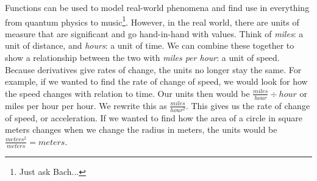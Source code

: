 \documentclass[../revisedmain.tex]{subfiles}
\begin{document}
	Functions can be used to model real-world phenomena and find use in everything from quantum physics to music\footnote{Just ask Bach...}. However, in the real world, there are units of measure that are significant and go hand-in-hand with values. Think of \textit{miles}: a unit of distance, and \textit{hours}: a unit of time. We can combine these together to show a relationship between the two with \textit{miles per hour}: a  unit of speed. Because derivatives give rates of change, the units no longer stay the same. For example, if we wanted to find the rate of change of speed, we would look for how the speed changes with relation to time. Our units then would be $\displaystyle\frac{miles}{hour}\div hour$ or miles per hour per hour. We rewrite this as $\displaystyle\frac{miles}{hour^2}$. This gives us the rate of change of speed, or acceleration. If we wanted to find how the area of a circle in square meters changes when we change the radius in meters, the units would be $\displaystyle\frac{meters^2}{meters} = meters$.
\end{document}

